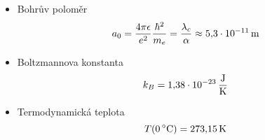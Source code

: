 \begin{itemize}
    \item Bohrův poloměr
        \begin{equation}
            a_{0}=\frac{4\pi\epsilon}{e^{2}}\frac{\hbar^{2}}{m_{e}}=\frac{\lambda_{c}}{\alpha}\approx5,\!3\cdot10^{-11}\,\mathrm{{m}}
        \end{equation}

    \item Boltzmannova konstanta
        \begin{equation}
            k_{B}=1,\!38\cdot10^{-23}\,\mathrm{{\frac{J}{K}}}
        \end{equation}

    \item Termodynamická teplota
        \begin{equation}
            T(0\,\mathrm{{^{\circ}C}})=273,\!15\,\mathrm{{K}}
        \end{equation}
\end{itemize}